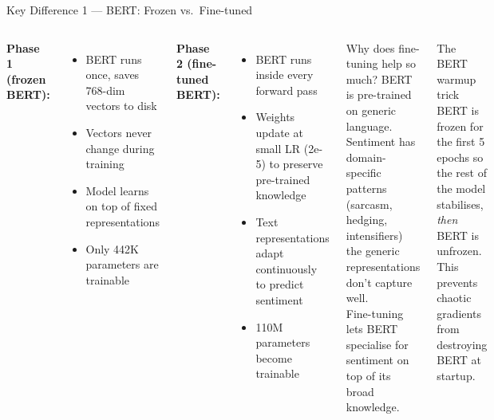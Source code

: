 \documentclass[aspectratio=169]{beamer}
\begin{document}
\begin{frame}{Key Difference 1 — BERT: Frozen vs.\ Fine-tuned}
  \vspace{-4pt}
  \begin{columns}[T]
      \small\textbf{Phase 1 (frozen BERT):}
      \begin{itemize}\setlength{\itemsep}{1pt}
        \item BERT runs once, saves 768-dim vectors to disk
        \item Vectors never change during training
        \item Model learns on top of fixed representations
        \item Only 442K parameters are trainable
      \end{itemize}

      \vspace{4pt}
      \small\textbf{Phase 2 (fine-tuned BERT):}
      \begin{itemize}\setlength{\itemsep}{1pt}
        \item BERT runs inside every forward pass
        \item Weights update at small LR (2e-5) to preserve pre-trained knowledge
        \item Text representations adapt continuously to predict sentiment
        \item 110M parameters become trainable
      \end{itemize}

      \begin{alertblock}{Why does fine-tuning help so much?}
        \small
        BERT is pre-trained on generic language. Sentiment has domain-specific
        patterns (sarcasm, hedging, intensifiers) the generic representations
        don't capture well.\\[4pt]
        Fine-tuning lets BERT specialise for sentiment on top of its
        broad knowledge.
      \end{alertblock}

      \vspace{4pt}
      \begin{exampleblock}{The BERT warmup trick}
        \small
        BERT is frozen for the first 5 epochs so the rest of the model
        stabilises, \emph{then} BERT is unfrozen. This prevents chaotic
        gradients from destroying BERT at startup.
      \end{exampleblock}
  \end{columns}
\end{frame}
\end{document}
